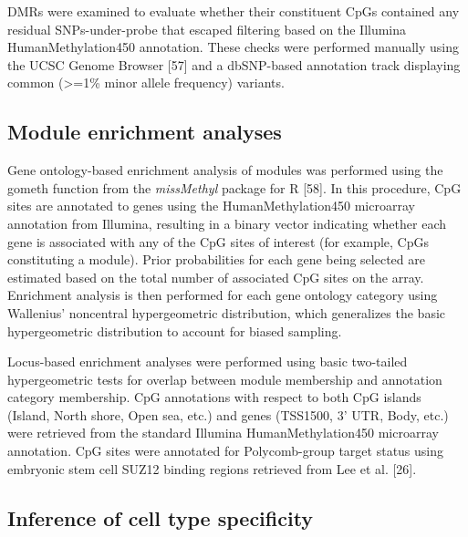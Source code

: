 \documentclass[]{bmcart}
\theoremstyle{definition}
\theoremstyle{definition}
\theoremstyle{definition}
\theoremstyle{remark}
\begin{document}
DMRs were examined to evaluate whether their constituent CpGs contained
any residual SNPs-under-probe that escaped filtering based on the
Illumina HumanMethylation450 annotation. These checks were performed
manually using the UCSC Genome Browser {[}57{]} and a dbSNP-based
annotation track displaying common (\textgreater{}=1\% minor allele
frequency) variants.

\subsection{Module enrichment
analyses}\label{module-enrichment-analyses}

Gene ontology-based enrichment analysis of modules was performed using
the gometh function from the \emph{missMethyl} package for R {[}58{]}.
In this procedure, CpG sites are annotated to genes using the
HumanMethylation450 microarray annotation from Illumina, resulting in a
binary vector indicating whether each gene is associated with any of the
CpG sites of interest (for example, CpGs constituting a module). Prior
probabilities for each gene being selected are estimated based on the
total number of associated CpG sites on the array. Enrichment analysis
is then performed for each gene ontology category using Wallenius'
noncentral hypergeometric distribution, which generalizes the basic
hypergeometric distribution to account for biased sampling.

Locus-based enrichment analyses were performed using basic two-tailed
hypergeometric tests for overlap between module membership and
annotation category membership. CpG annotations with respect to both CpG
islands (Island, North shore, Open sea, etc.) and genes (TSS1500, 3'
UTR, Body, etc.) were retrieved from the standard Illumina
HumanMethylation450 microarray annotation. CpG sites were annotated for
Polycomb-group target status using embryonic stem cell SUZ12 binding
regions retrieved from Lee et al. {[}26{]}.

\subsection{Inference of cell type
specificity}\label{inference-of-cell-type-specificity}
\end{document}
